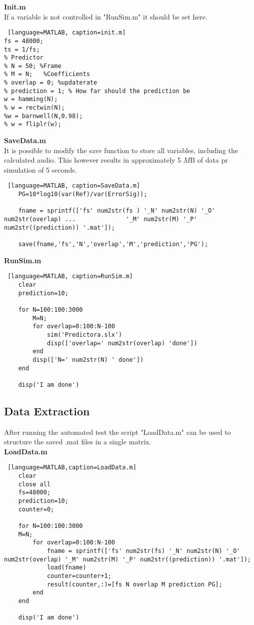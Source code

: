\textbf{Init.m}\\
If a variable is not controlled in "RunSim.m" it should be set here. 
\begin{lstlisting} [language=MATLAB, caption=init.m]
fs = 48000;
ts = 1/fs; 
% Predictor 
% N = 50; %Frame
% M = N;   %Coefficients
% overlap = 0; %updaterate
% prediction = 1; % How far should the prediction be
w = hamming(N); 
% w = rectwin(N);
%w = barnwell(N,0.98);
% w = fliplr(w);
\end{lstlisting}

\textbf{SaveData.m}\\
It is possible to modify the save function to store all variables, including the calculated audio. This however results in approximately 5 $M$B of data pr simulation of 5 seconds.  
\begin{lstlisting} [language=MATLAB, caption=SaveData.m]
	PG=10*log10(var(Ref)/var(ErrorSig));
	
	fname = sprintf(['fs' num2str(fs ) '_N' num2str(N) '_O' num2str(overlap) ...              '_M' num2str(M) '_P' num2str((prediction)) '.mat']);
	
	save(fname,'fs','N','overlap','M','prediction','PG');
\end{lstlisting}

\textbf{RunSim.m}
\begin{lstlisting} [language=MATLAB, caption=RunSim.m]
	clear 
	prediction=10;
	
	for N=100:100:3000
		M=N;
		for overlap=0:100:N-100
			sim('Predictora.slx')
			disp(['overlap=' num2str(overlap) 'done'])
		end
		disp(['N=' num2str(N) ' done'])
	end
	
	disp('I am done')	
\end{lstlisting}

\subsection{Data Extraction}
After running the automated test the script "LoadData.m" can be used to structure the saved .mat files in a single matrix.\\
\textbf{LoadData.m}
\begin{lstlisting} [language=MATLAB,caption=LoadData.m]
	clear
	close all
	fs=48000;
	prediction=10;
	counter=0;
	
	for N=100:100:3000
	M=N;
		for overlap=0:100:N-100
			fname = sprintf(['fs' num2str(fs) '_N' num2str(N) '_O' num2str(overlap) '_M' num2str(M) '_P' num2str((prediction)) '.mat']);
			load(fname)
			counter=counter+1;
			result(counter,:)=[fs N overlap M prediction PG]; 
		end
	end
	
	disp('I am done')
\end{lstlisting}

